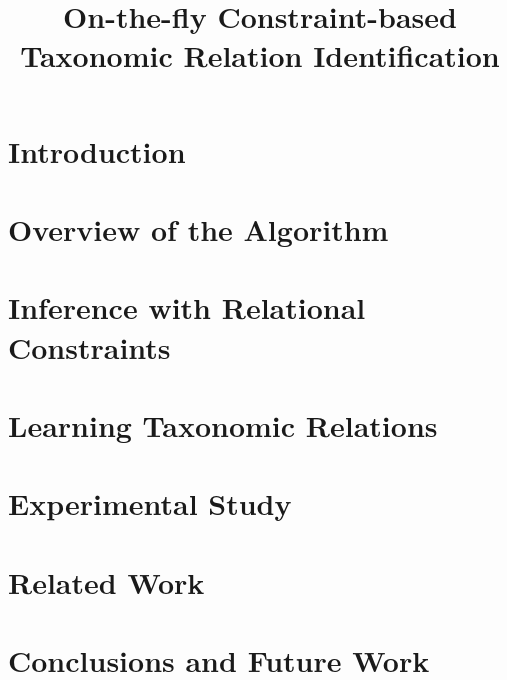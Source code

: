\documentclass[a4paper,11pt]{article}
\title{On-the-fly Constraint-based Taxonomic Relation Identification}
\author{}
\date{}
\begin{document}
\maketitle

\newcommand{\ignore}[1]{}

\begin{abstract}

\end{abstract}

\section{Introduction}


\section{Overview of the Algorithm}
\label{sec:overview-algorithm}


\section{Inference with Relational Constraints}
\label{sec:inference}


\section{Learning Taxonomic Relations}
\label{sec:learning}


\section{Experimental Study}
\label{sec:experiments}


\section{Related Work}
\label{sec:related-work}


\section{Conclusions and Future Work}
\label{sec:conclusions}




\end{document}

